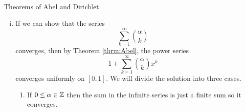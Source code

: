 \begin{section}{Theorems of Abel and Dirichlet}
\begin{soln}
\begin{enumerate}[i)]
		\item
			If we can show that the series
				\begin{displaymath}
					\sum_{k=1}^\infty {\alpha \choose k}
				\end{displaymath}
			converges, then by Theorem \ref{thrm:Abel}, the
			power series
				\begin{displaymath}
					1 + \sum_{k=1}^\infty {\alpha \choose k} x^k
				\end{displaymath}
			converges uniformly on $[0,1]$. We will divide 
			the solution into three cases.
				\begin{enumerate}[{Case} 1.]
				
					\item
						If $0 \leq \isintgr[\alpha]$ then the sum
						in the infinite series is just a finite
						sum so it converges.
						

\end{enumerate}
\end{enumerate}
\end{soln}
\end{section}
